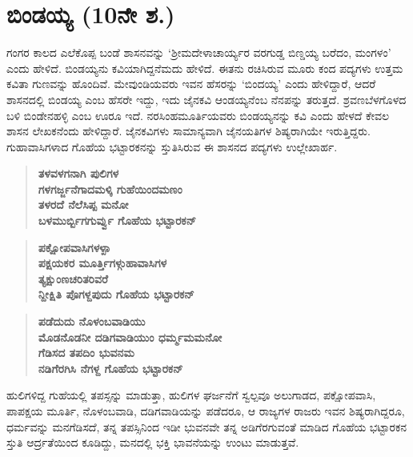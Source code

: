 \section{ಬಿಂಡಯ್ಯ (10ನೇ ಶ.)}

ಗಂಗರ ಕಾಲದ ಎಲೆಕೊಪ್ಪ ಬಂಡೆ ಶಾಸನವನ್ನು ‘ಶ‍್ರೀಮದೇಳಾಚಾರ್ಯ್ಯರ ವರಗುಡ್ಡ ಬಿಣ್ಡಯ್ಯ ಬರೆದಂ, ಮಂಗಳಂ’ ಎಂದು ಹೇಳಿದೆ. ಬಿಂಡಯ್ಯನು ಕವಿಯಾಗಿದ್ದನೆಮದು ಹೇಳಿದೆ. ಈತನು ರಚಿಸಿರುವ ಮೂರು ಕಂದ ಪದ್ಯಗಳು ಉತ್ತಮ ಕವಿತಾ ಗುಣವನ್ನು ಹೊಂದಿವೆ. ಮೇವುಂಡಿಯವರು ಇವನ ಹೆಸರನ್ನು ‘ಬಿಂದಯ್ಯ’ ಎಂದು ಹೇಳಿದ್ದಾರೆ, ಆದರೆ ಶಾಸನದಲ್ಲಿ ಬಿಂಡಯ್ಯ ಎಂಬ ಹೆಸರೇ ಇದ್ದು, ಇದು ಜೈನಕವಿ ಆಂಡಯ್ಯನೆಂಬ ನೆನಪನ್ನು ತರುತ್ತದೆ. ಶ್ರವಣಬೆಳಗೊಳದ ಬಳಿ ಬಿಂಡೇನಹಳ್ಳಿ ಎಂಬ ಊರೂ ಇದೆ. ನರಸಿಂಹಮೂರ್ತಿಯವರು ಬಿಂಡಯ್ಯನನ್ನು ಕವಿ ಎಂದು ಹೇಳದೆ ಕೇವಲ ಶಾಸನ ಲೇಖಕನೆಂದು ಹೇಳಿದ್ದಾರೆ. ಜೈನಕವಿಗಳು ಸಾಮಾನ್ಯವಾಗಿ ಜೈನಯತಿಗಳ ಶಿಷ್ಯರಾಗಿಯೇ ಇರುತ್ತಿದ್ದರು. ಗುಹಾವಾಸಿಗಳಾದ ಗೊಹೆಯ ಭಟ್ಟಾರಕನನ್ನು ಸ್ತುತಿಸಿರುವ ಈ ಶಾಸನದ ಪದ್ಯಗಳು ಉಲ್ಲೇಖಾರ್ಹ.

\begin{verse}
\textbf{ತಳವಳಗನಾಗಿ ಪುಲಿಗಳ} \\\textbf{ಗಳಗರ್ಜ್ಜನೆಗಾದಮಳ್ಕಿ ಗುಹೆಯಿಂದಮಣಂ} \\\textbf{ತಳರದೆ ನೆಲೆಸಿಪ್ಪ ಮನೋ} \\\textbf{ಬಳಮುರ್ಬ್ಬಿಗಗುರ್ವ್ವು ಗೊಹೆಯ ಭಟ್ಟಾರಕನ್​}
\end{verse}

\begin{verse}
\textbf{ಪಕ್ಷೋಪವಾಸಿಗಳಳ್ಪಾ} \\\textbf{ಪಕ್ಷಯಕರ ಮೂರ್ತ್ತಿಗಳ್ಗುಹಾವಾಸಿಗಳ} \\\textbf{ತ್ಯಕ್ಷುಂಣಚರಿತರಿವರೆ} \\\textbf{ನ್ದೀಕ್ಷಿತಿ ಪೊಗಳ್ದಪುದು ಗೊಹೆಯ ಭಟ್ಟಾರಕನ್​}
\end{verse}

\begin{verse}
\textbf{ಪಡೆದುದು ನೊಳಂಬವಾಡಿಯು} \\\textbf{ಮೊಡನೊಡನೀ ದಡಿಗವಾಡಿಯುಂ ಧರ್ಮ್ಮಮಮನೋ} \\\textbf{ಗೆಡಿಸದ ತಪದಿಂ ಭುವನಮ} \\\textbf{ನಡಿಗೆರಗಿಸಿ ನೆಗಳ್ದ ಗೊಹೆಯ ಭಟ್ಟಾರಕನ್​ }
\end{verse}

ಹುಲಿಗಳಿದ್ದ ಗುಹೆಯಲ್ಲಿ ತಪಸ್ಸನ್ನು ಮಾಡುತ್ತಾ, ಹುಲಿಗಳ ಘರ್ಜನೆಗೆ ಸ್ವಲ್ಪವೂ ಅಲುಗಾಡದ, ಪಕ್ಷೋಪವಾಸಿ, ಪಾಪಕ್ಷಯ ಮೂರ್ತಿ, ನೊಳಂಬವಾಡಿ, ದಡಿಗವಾಡಿಯನ್ನು ಪಡೆದರೂ, ಆ ರಾಜ್ಯಗಳ ರಾಜರು ಇವನ ಶಿಷ್ಯರಾಗಿದ್ದರೂ, ಧರ್ಮವನ್ನು ಮನಗೆಡಿಸದೆ, ತನ್ನ ತಪಸ್ಸಿನಿಂದ ಇಡೀ ಭುವನವೇ ತನ್ನ ಅಡಿಗೆರಗುವಂತೆ ಮಾಡಿದ ಗೊಹೆಯ ಭಟ್ಟಾರಕನ ಸ್ತುತಿ ಆರ್ದ್ರತೆಯಿಂದ ಕೂಡಿದ್ದು, ಮನದಲ್ಲಿ ಭಕ್ತಿ ಭಾವನೆಯನ್ನು ಉಂಟು ಮಾಡುತ್ತವೆ.



